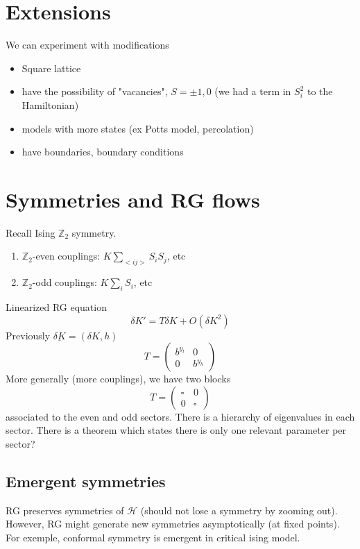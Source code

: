 \documentclass[a4paper]{book}
\theoremstyle{definition}
\theoremstyle{remark}
\begin{document}
\section{Extensions}

We can experiment with modifications 
\begin{itemize}
    \item Square lattice
    \item have the possibility of "vacancies", $S = \pm 1, 0$ (we had a term in $S_i^2$ to the Hamiltonian)
    \item models with more states (ex Potts model, percolation)
    \item have boundaries, boundary conditions
\end{itemize}

\section{Symmetries and RG flows}
Recall Ising $\mathbb{Z}_2$ symmetry. 
\begin{enumerate}
    \item $\mathbb{Z}_2$-even couplings: $K\sum_{<ij>}S_iS_j$, etc 
    \item $\mathbb{Z}_2$-odd couplings: $K\sum_{i}S_i$, etc 
\end{enumerate}
Linearized RG equation 
\begin{equation}
    \delta K' = T \delta K  + O(\delta K^2)
\end{equation}
Previously $\underline{\delta K} = (\delta K, h)$
\begin{equation}
    T = \begin{pmatrix}
        b^{y_t} & 0 \\ 0 & b^{y_h}
    \end{pmatrix}
\end{equation}
More generally (more couplings), we have two blocks 
\begin{equation}
    T = \begin{pmatrix}
        \square & 0 \\ 0 & \square
    \end{pmatrix}
\end{equation}
associated to the even and odd sectors. There is a hierarchy of eigenvalues in each sector. There is a theorem which states there is only one relevant parameter per sector?

\subsection{Emergent symmetries}
RG preserves symmetries of $\mathcal{H}$ (should not lose a symmetry by zooming out). However, RG might generate new symmetries asymptotically (at fixed points). For exemple, conformal symmetry is emergent in critical ising model. \par \medskip 
\end{document}
